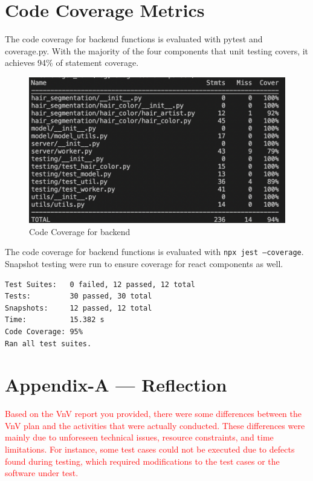 \documentclass[12pt, oneside, openany, titlepage]{article}
\begin{document}
\section{Code Coverage Metrics}

The code coverage for backend functions is evaluated with pytest and coverage.py. With the majority of the four components that unit testing covers, it achieves 94\% of statement coverage.

\begin{figure}[h]
  \centering
  \includegraphics[width=0.8\linewidth]{VnVReport/be_cover.png}
  \caption{Code Coverage for backend}
\end{figure}

\newline
\noindent The code coverage for backend functions is evaluated with \texttt{npx jest --coverage}. Snapshot testing were run to ensure coverage for react components as well. \\
\begin{verbatim}
Test Suites:   0 failed, 12 passed, 12 total
Tests:         30 passed, 30 total
Snapshots:     12 passed, 12 total
Time:          15.382 s
Code Coverage: 95%
Ran all test suites.
\end{verbatim}





\newpage{}
\section{Appendix-A --- Reflection}

\textcolor{red}{Based on the VnV report you provided, there were some differences between the VnV plan and the activities that were actually conducted. These differences were mainly due to unforeseen technical issues, resource constraints, and time limitations. For instance, some test cases could not be executed due to defects found during testing, which required modifications to the test cases or the software under test.}
\end{document}
